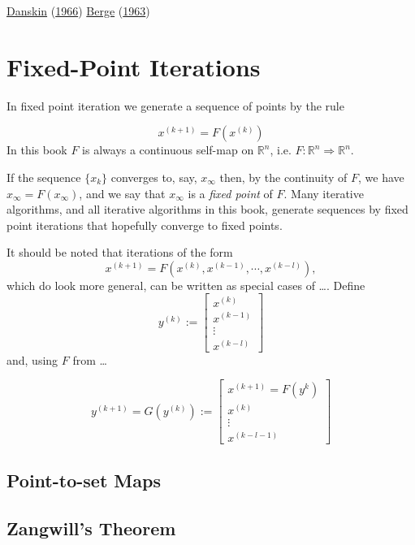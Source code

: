 \documentclass[
  12pt,
]{book}
\theoremstyle{definition}
\theoremstyle{definition}
\theoremstyle{definition}
\theoremstyle{definition}
\theoremstyle{remark}
\begin{document}
\protect\hyperlink{ref-danskin_66}{Danskin} (\protect\hyperlink{ref-danskin_66}{1966})
\protect\hyperlink{ref-berge_63}{Berge} (\protect\hyperlink{ref-berge_63}{1963})

\hypertarget{apiterate}{%
\section{Fixed-Point Iterations}\label{apiterate}}

In fixed point iteration we generate a sequence of points by the rule

\[
x^{(k+1)}=F(x^{(k)})
\]
In this book \(F\) is always a continuous self-map on \(\mathbb{R}^n\), i.e.
\(F:\mathbb{R}^n\Rightarrow\mathbb{R}^n\).

If the sequence \(\{x_k\}\) converges to, say, \(x_\infty\) then, by the continuity of \(F\),
we have \(x_\infty=F(x_\infty)\), and we say that \(x_\infty\) is a \emph{fixed point} of \(F\). Many iterative algorithms, and all iterative algorithms in this book, generate sequences by fixed point
iterations that hopefully converge to fixed points.

It should be noted that iterations of the form
\[
x^{(k+1)}=F(x^{(k)},x^{(k-1)},\cdots,x^{(k-l)}),
\]
which do look more general, can be written as special cases of \ldots. Define
\[
y^{(k)}:=\begin{bmatrix}x^{(k)}\\x^{(k-1)}\\\vdots\\x^{(k-l)}\end{bmatrix}
\]
and, using \(F\) from \ldots{}

\[
y^{(k+1)}=G(y^{(k)}):=\begin{bmatrix}x^{(k+1)}=F(y^{k})\\x^{(k)}\\\vdots\\x^{(k-l-1)}\end{bmatrix}
\]

\hypertarget{point-to-set-maps}{%
\subsection{Point-to-set Maps}\label{point-to-set-maps}}

\hypertarget{zangwill}{%
\subsection{Zangwill's Theorem}\label{zangwill}}
\end{document}
